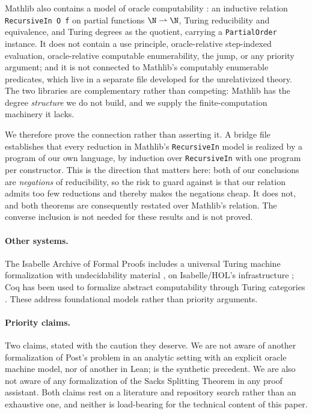 Mathlib also contains a model of oracle computability
\cite{mathlibTuringDegree}: an inductive relation \texttt{RecursiveIn O f}
on partial functions $\N \rightharpoonup \N$, Turing reducibility and
equivalence, and Turing degrees as the quotient, carrying a
\texttt{PartialOrder} instance.  It does not contain a use principle,
oracle-relative step-indexed evaluation, oracle-relative computable
enumerability, the jump, or any priority argument; and it is not connected
to Mathlib's computably enumerable predicates, which live in a separate
file developed for the unrelativized theory.  The two libraries are
complementary rather than competing: Mathlib has the degree \emph{structure}
we do not build, and we supply the finite-computation machinery it lacks.

We therefore prove the connection rather than asserting it.  A bridge file
establishes that every reduction in Mathlib's \texttt{RecursiveIn} model is
realized by a program of our own language, by induction over
\texttt{RecursiveIn} with one program per constructor.  This is the
direction that matters here: both of our conclusions are \emph{negations}
of reducibility, so the risk to guard against is that our relation admits
too few reductions and thereby makes the negations cheap.  It does not, and
both theorems are consequently restated over Mathlib's relation.  The
converse inclusion is not needed for these results and is not proved.

\paragraph{Other systems.}
The Isabelle Archive of Formal Proofs includes a universal Turing machine
formalization with undecidability material \cite{afpUTM}, on Isabelle/HOL's
infrastructure \cite{nipkow2002}; Coq has been used to formalize abstract
computability through Turing categories \cite{cockett2018}.  These address
foundational models rather than priority arguments.

\paragraph{Priority claims.}
Two claims, stated with the caution they deserve.  We are not aware of
another formalization of Post's problem in an analytic setting with an
explicit oracle machine model, nor of another in Lean; \cite{zeng2024post}
is the synthetic precedent.  We are also not aware of any formalization of
the Sacks Splitting Theorem in any proof assistant.  Both claims rest on a
literature and repository search rather than an exhaustive one, and neither
is load-bearing for the technical content of this paper.
